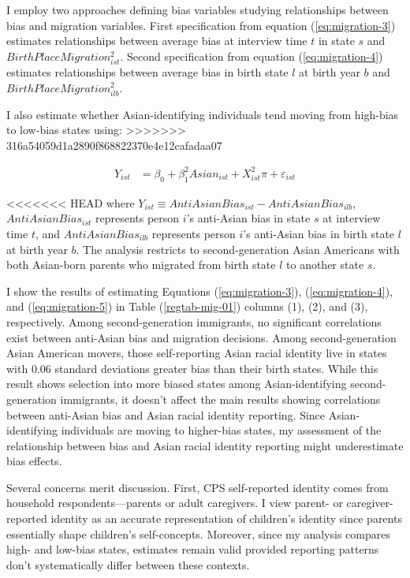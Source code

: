 I employ two approaches defining bias variables studying relationships between bias and migration variables. First specification from equation (\ref{eq:migration-3}) estimates relationships between average bias at interview time $t$ in state $s$ and $BirthPlaceMigration_{ist}^2$. Second specification from equation (\ref{eq:migration-4}) estimates relationships between average bias in birth state $l$ at birth year $b$ and $BirthPlaceMigration_{ilb}^2$.

I also estimate whether Asian-identifying individuals tend moving from high-bias to low-bias states using:
>>>>>>> 316a54059d1a2890f868822370e4e12cafadaa07

\begin{align}
Y_{ist} &= \beta_0 + \beta_1^2 Asian_{ist} +
                   X_{ist}^2\pi
                   + \varepsilon_{ist} \label{eq:migration-5}
\end{align}

<<<<<<< HEAD
where $Y_{ist} \equiv AntiAsianBias_{ist} - AntiAsianBias_{ilb}$, $AntiAsianBias_{ist}$ represents person $i$'s anti-Asian bias in state $s$ at interview time $t$, and $AntiAsianBias_{ilb}$ represents person $i$'s anti-Asian bias in birth state $l$ at birth year $b$. The analysis restricts to second-generation Asian Americans with both Asian-born parents who migrated from birth state $l$ to another state $s$.

I show the results of estimating Equations (\ref{eq:migration-3}), (\ref{eq:migration-4}), and (\ref{eq:migration-5}) in Table (\ref{regtab-mig-01}) columns (1), (2), and (3), respectively. Among second-generation immigrants, no significant correlations exist between anti-Asian bias and migration decisions. Among second-generation Asian American movers, those self-reporting Asian racial identity live in states with 0.06 standard deviations greater bias than their birth states. While this result shows selection into more biased states among Asian-identifying second-generation immigrants, it doesn't affect the main results showing correlations between anti-Asian bias and Asian racial identity reporting. Since Asian-identifying individuals are moving to higher-bias states, my assessment of the relationship between bias and Asian racial identity reporting might underestimate bias effects.

Several concerns merit discussion. First, CPS self-reported identity comes from household respondents---parents or adult caregivers. I view parent- or caregiver-reported identity as an accurate representation of children's identity since parents essentially shape children's self-concepts. Moreover, since my analysis compares high- and low-bias states, estimates remain valid provided reporting patterns don't systematically differ between these contexts.

